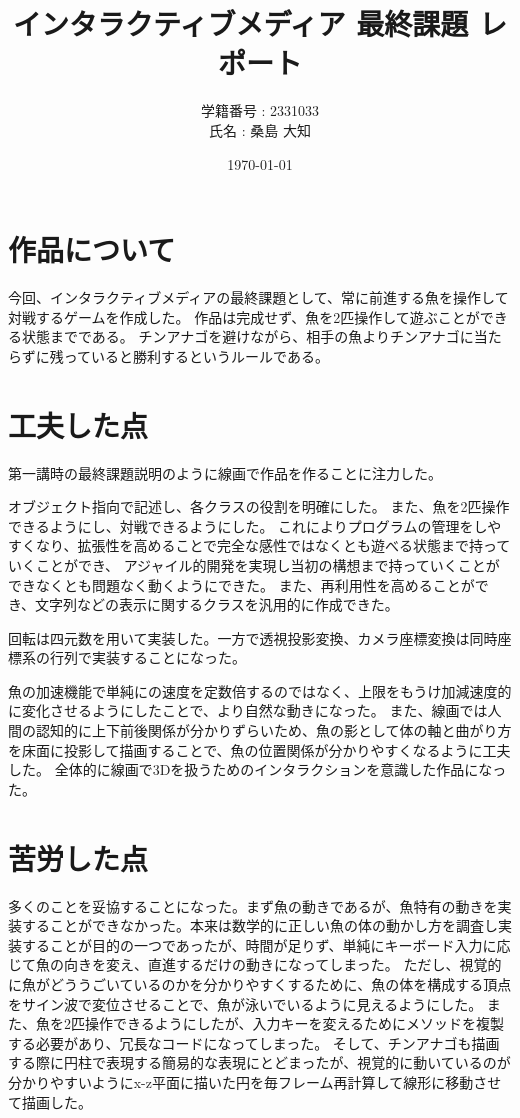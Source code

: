 \documentclass[uplatex,dvipdfmx]{jsarticle}
\title{インタラクティブメディア 最終課題 レポート}
\author{学籍番号 : 2331033\\氏名 : 桑島 大知}
\date{\today}
\begin{document}
\maketitle
\section{作品について}
今回、インタラクティブメディアの最終課題として、常に前進する魚を操作して対戦するゲームを作成した。
作品は完成せず、魚を2匹操作して遊ぶことができる状態までである。
チンアナゴを避けながら、相手の魚よりチンアナゴに当たらずに残っていると勝利するというルールである。
\section{工夫した点}
第一講時の最終課題説明のように線画で作品を作ることに注力した。

オブジェクト指向で記述し、各クラスの役割を明確にした。
また、魚を2匹操作できるようにし、対戦できるようにした。
これによりプログラムの管理をしやすくなり、拡張性を高めることで完全な感性ではなくとも遊べる状態まで持っていくことができ、
アジャイル的開発を実現し当初の構想まで持っていくことができなくとも問題なく動くようにできた。
また、再利用性を高めることができ、文字列などの表示に関するクラスを汎用的に作成できた。

回転は四元数を用いて実装した。一方で透視投影変換、カメラ座標変換は同時座標系の行列で実装することになった。

魚の加速機能で単純にの速度を定数倍するのではなく、上限をもうけ加減速度的に変化させるようにしたことで、より自然な動きになった。
また、線画では人間の認知的に上下前後関係が分かりずらいため、魚の影として体の軸と曲がり方を床面に投影して描画することで、魚の位置関係が分かりやすくなるように工夫した。
全体的に線画で3Dを扱うためのインタラクションを意識した作品になった。
\section{苦労した点}
多くのことを妥協することになった。まず魚の動きであるが、魚特有の動きを実装することができなかった。本来は数学的に正しい魚の体の動かし方を調査し実装することが目的の一つであったが、時間が足りず、単純にキーボード入力に応じて魚の向きを変え、直進するだけの動きになってしまった。
ただし、視覚的に魚がどううごいているのかを分かりやすくするために、魚の体を構成する頂点をサイン波で変位させることで、魚が泳いでいるように見えるようにした。
また、魚を2匹操作できるようにしたが、入力キーを変えるためにメソッドを複製する必要があり、冗長なコードになってしまった。
そして、チンアナゴも描画する際に円柱で表現する簡易的な表現にとどまったが、視覚的に動いているのが分かりやすいようにx-z平面に描いた円を毎フレーム再計算して線形に移動させて描画した。
\end{document}
